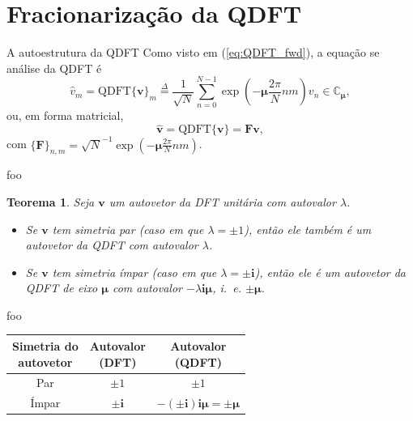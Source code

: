 \documentclass[10pt,compress]{beamer}
\newcommand{\qi}{\boldsymbol{i}}
\newcommand{\qj}{\boldsymbol{j}}
\newcommand{\qk}{\boldsymbol{k}}
\newcommand{\qmu}{\boldsymbol{\mu}}
\newtheorem{teorema}{Teorema}
\begin{document}
\section{Fracionariza\c c\~ao da QDFT}\label{sec:cnt}

\begin{frame}{A autoestrutura da QDFT}
Como visto em (\ref{eq:QDFT_fwd}), a equa\c c\~ao se an\'alise da QDFT \'e
\begin{equation}
\widehat{v}_m = \text{QDFT}\{ \mathbf{v} \}_m \overset{\Delta}{=} \frac{1}{\sqrt{N}} \sum_{n=0}^{N-1}  \exp \left( -\qmu \frac{2\pi}{N} nm \right) v_n \in \mathbb{C}_{\qmu},
\end{equation}
ou, em forma matricial,
\begin{equation}
\widehat{\mathbf{v}} = \text{QDFT}\{ \mathbf{v} \} = \mathbf{F} \mathbf{v},
\end{equation}
com $ \{\mathbf{F}\}_{n,m} = \sqrt{N}^{-1} \exp \left( -\qmu \frac{2\pi}{N} nm \right)$.
\end{frame}

\begin{frame}{foo}
\begin{teorema}
\label{th:01}
Seja $ \mathbf{v} $ um autovetor da DFT unit\'aria com autovalor $ \lambda $.
\begin{itemize}
\item[(a)] Se $ \mathbf{v} $ tem simetria par (caso em que $ \lambda = \pm 1 $), ent\~ao ele tamb\'em \'e um autovetor da QDFT com autovalor $ \lambda $.
\item[(b)] Se $ \mathbf{v} $ tem simetria \'impar (caso em que $ \lambda = \pm \qi $), ent\~ao ele \'e um autovetor da QDFT de eixo $ \qmu $ com autovalor $ -\lambda \qi \qmu$, i.~e. $ \pm \qmu $.
\end{itemize}
\end{teorema}
\end{frame}

\begin{frame}{foo}
\begin{center}
\label{tab:01}
\begin{tabular}{ccc}
\toprule
\shortstack{Simetria do\\autovetor} & \shortstack{Autovalor\\(DFT)} & \shortstack{Autovalor\\(QDFT)} \\
\midrule
Par & $ \pm 1 $ & $ \pm 1 $ \\
\'Impar & $ \pm \qi $ & $ - (\pm \qi) \qi \qmu = \pm \qmu $\\
\bottomrule
\end{tabular}
\end{center}
\end{frame}
\end{document}
